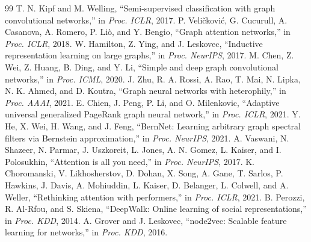 \documentclass[a4paper,10pt]{article}
\begin{document}
\begin{thebibliography}{99}
 T. N. Kipf and M. Welling, ``Semi-supervised classification with graph convolutional networks,'' in \textit{Proc. ICLR}, 2017.
 P. Veličković, G. Cucurull, A. Casanova, A. Romero, P. Liò, and Y. Bengio, ``Graph attention networks,'' in \textit{Proc. ICLR}, 2018.
 W. Hamilton, Z. Ying, and J. Leskovec, ``Inductive representation learning on large graphs,'' in \textit{Proc. NeurIPS}, 2017.
 M. Chen, Z. Wei, Z. Huang, B. Ding, and Y. Li, ``Simple and deep graph convolutional networks,'' in \textit{Proc. ICML}, 2020.
 J. Zhu, R. A. Rossi, A. Rao, T. Mai, N. Lipka, N. K. Ahmed, and D. Koutra, ``Graph neural networks with heterophily,'' in \textit{Proc. AAAI}, 2021.
 E. Chien, J. Peng, P. Li, and O. Milenkovic, ``Adaptive universal generalized PageRank graph neural network,'' in \textit{Proc. ICLR}, 2021.
 Y. He, X. Wei, H. Wang, and J. Feng, ``BernNet: Learning arbitrary graph spectral filters via Bernstein approximation,'' in \textit{Proc. NeurIPS}, 2021.
 A. Vaswani, N. Shazeer, N. Parmar, J. Uszkoreit, L. Jones, A. N. Gomez, L. Kaiser, and I. Polosukhin, ``Attention is all you need,'' in \textit{Proc. NeurIPS}, 2017.
 K. Choromanski, V. Likhosherstov, D. Dohan, X. Song, A. Gane, T. Sarlos, P. Hawkins, J. Davis, A. Mohiuddin, L. Kaiser, D. Belanger, L. Colwell, and A. Weller, ``Rethinking attention with performers,'' in \textit{Proc. ICLR}, 2021.
 B. Perozzi, R. Al-Rfou, and S. Skiena, ``DeepWalk: Online learning of social representations,'' in \textit{Proc. KDD}, 2014.
 A. Grover and J. Leskovec, ``node2vec: Scalable feature learning for networks,'' in \textit{Proc. KDD}, 2016.
\end{thebibliography}
\end{document}

